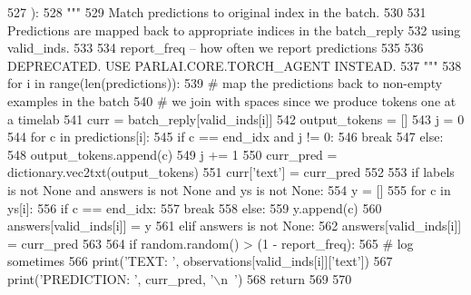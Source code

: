 \begin{DoxyCode}
527     ):
528         \textcolor{stringliteral}{"""}
529 \textcolor{stringliteral}{        Match predictions to original index in the batch.}
530 \textcolor{stringliteral}{}
531 \textcolor{stringliteral}{        Predictions are mapped back to appropriate indices in the batch\_reply}
532 \textcolor{stringliteral}{        using valid\_inds.}
533 \textcolor{stringliteral}{}
534 \textcolor{stringliteral}{        report\_freq -- how often we report predictions}
535 \textcolor{stringliteral}{}
536 \textcolor{stringliteral}{        DEPRECATED. USE PARLAI.CORE.TORCH\_AGENT INSTEAD.}
537 \textcolor{stringliteral}{        """}
538         \textcolor{keywordflow}{for} i \textcolor{keywordflow}{in} range(len(predictions)):
539             \textcolor{comment}{# map the predictions back to non-empty examples in the batch}
540             \textcolor{comment}{# we join with spaces since we produce tokens one at a timelab}
541             curr = batch\_reply[valid\_inds[i]]
542             output\_tokens = []
543             j = 0
544             \textcolor{keywordflow}{for} c \textcolor{keywordflow}{in} predictions[i]:
545                 \textcolor{keywordflow}{if} c == end\_idx \textcolor{keywordflow}{and} j != 0:
546                     \textcolor{keywordflow}{break}
547                 \textcolor{keywordflow}{else}:
548                     output\_tokens.append(c)
549                 j += 1
550             curr\_pred = dictionary.vec2txt(output\_tokens)
551             curr[\textcolor{stringliteral}{'text'}] = curr\_pred
552 
553             \textcolor{keywordflow}{if} labels \textcolor{keywordflow}{is} \textcolor{keywordflow}{not} \textcolor{keywordtype}{None} \textcolor{keywordflow}{and} answers \textcolor{keywordflow}{is} \textcolor{keywordflow}{not} \textcolor{keywordtype}{None} \textcolor{keywordflow}{and} ys \textcolor{keywordflow}{is} \textcolor{keywordflow}{not} \textcolor{keywordtype}{None}:
554                 y = []
555                 \textcolor{keywordflow}{for} c \textcolor{keywordflow}{in} ys[i]:
556                     \textcolor{keywordflow}{if} c == end\_idx:
557                         \textcolor{keywordflow}{break}
558                     \textcolor{keywordflow}{else}:
559                         y.append(c)
560                 answers[valid\_inds[i]] = y
561             \textcolor{keywordflow}{elif} answers \textcolor{keywordflow}{is} \textcolor{keywordflow}{not} \textcolor{keywordtype}{None}:
562                 answers[valid\_inds[i]] = curr\_pred
563 
564             \textcolor{keywordflow}{if} random.random() > (1 - report\_freq):
565                 \textcolor{comment}{# log sometimes}
566                 print(\textcolor{stringliteral}{'TEXT: '}, observations[valid\_inds[i]][\textcolor{stringliteral}{'text'}])
567                 print(\textcolor{stringliteral}{'PREDICTION: '}, curr\_pred, \textcolor{stringliteral}{'\(\backslash\)n~'})
568         \textcolor{keywordflow}{return}
569 
570 
\end{DoxyCode}
